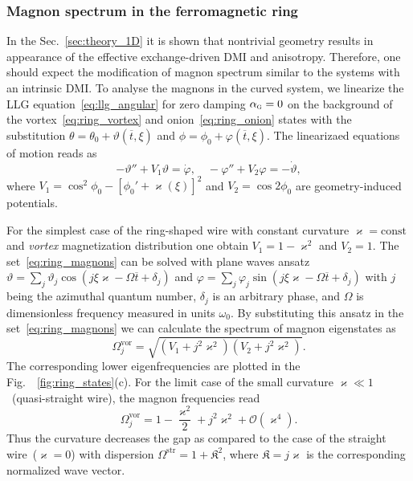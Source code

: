 
\subsubsection{Magnon spectrum in the ferromagnetic ring}\label{sec:ring_eigenmodes}

In the Sec.~\ref{sec:theory_1D} it is shown that nontrivial geometry results in appearance of the effective exchange-driven DMI and anisotropy. Therefore, one should expect the modification of magnon spectrum similar to the systems with an intrinsic DMI. To analyse the magnons in the curved system, we linearize the LLG equation~\eqref{eq:llg_angular} for zero damping $\alpha_\textsc{g}=0$ on the background of the vortex~\eqref{eq:ring_vortex} and onion~\eqref{eq:ring_onion} states with the substitution $\theta=\theta_0+\vartheta(\overline{t},\xi)$ and $\phi=\phi_0+\varphi(\overline{t},\xi)$. The linearizaed equations of motion reads as~\cite{Sheka15,Gaididei18a,Korniienko19b}
\begin{equation}\label{eq:ring_magnons}
-\vartheta''+V_1\vartheta = \dot{\varphi},\quad  -\varphi''+V_2\varphi = -\dot{\vartheta},
\end{equation}
where $V_1 = \cos^2\phi_0 - \left[\phi_0'+\varkappa(\xi)\right]^2$ and $V_2 = \cos2\phi_0$ are geometry-induced potentials.

For the simplest case of the ring-shaped wire with constant curvature $\varkappa=\text{const}$ and \textit{vortex} magnetization distribution one obtain $V_1=1-\varkappa^2$ and $V_2=1$. The set~\eqref{eq:ring_magnons} can be solved with plane waves ansatz $\vartheta=\sum_j \vartheta_j \cos(j\xi\varkappa-\Omega\overline{t}+\delta_j)$ and $\varphi=\sum_j \varphi_j \sin(j\xi\varkappa-\Omega\overline{t}+\delta_j)$ with $j$ being the azimuthal quantum number, $\delta_j$ is an arbitrary phase, and $\Omega$ is dimensionless frequency measured in units $\omega_0$. By substituting this ansatz in the set~\eqref{eq:ring_magnons} we can calculate the spectrum of magnon eigenstates as
\begin{equation}\label{eq:spec_rings}
\Omega^\text{vor}_j = \sqrt{\left(V_1+j^2\varkappa^2\right)\left(V_2+j^2\varkappa^2\right)}.
\end{equation}
The corresponding lower eigenfrequencies are plotted in the Fig.~~\ref{fig:ring_states}(c). For the limit case of the small curvature $\varkappa\ll1$~(quasi-straight wire), the magnon frequencies read
\begin{equation}\label{eq:spec_rings_small}
\Omega^\text{vor}_j = 1- \frac{\varkappa^2}{2}+j^2\varkappa^2+\mathcal{O}(\varkappa^4).
\end{equation}
Thus the curvature decreases the gap as compared to the case of the straight wire~($\varkappa=0$) with dispersion $\Omega^\text{str} = 1 + \mathfrak{K}^2$, where $\mathfrak{K}=j\varkappa$ is the corresponding normalized wave vector.

